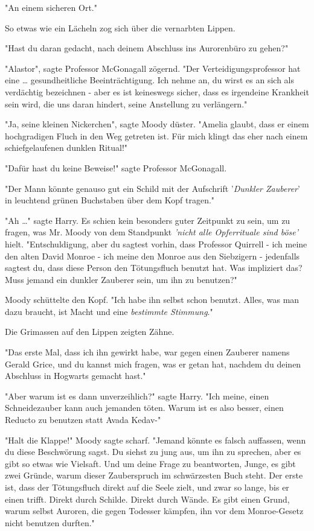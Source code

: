 {"An einem sicheren Ort."

So etwas wie ein Lächeln zog sich über die vernarbten Lippen.

"Hast du daran gedacht, nach deinem Abschluss ins Aurorenbüro zu gehen?"

"Alastor", sagte Professor McGonagall zögernd. "Der Verteidigungsprofessor hat eine … gesundheitliche Beeinträchtigung. Ich nehme an, du wirst es an sich als verdächtig bezeichnen - aber es ist keineswegs sicher, dass es irgendeine Krankheit sein wird, die uns daran hindert, seine Anstellung zu verlängern."

"Ja, seine kleinen Nickerchen", sagte Moody düster. "Amelia glaubt, dass er einem hochgradigen Fluch in den Weg getreten ist. Für mich klingt das eher nach einem schiefgelaufenen dunklen Ritual!"

"Dafür hast du keine Beweise!" sagte Professor McGonagall.

"Der Mann könnte genauso gut ein Schild mit der Aufschrift '\emph{Dunkler Zauberer}' in leuchtend grünen Buchstaben über dem Kopf tragen."

"Ah …" sagte Harry. Es schien kein besonders guter Zeitpunkt zu sein, um zu fragen, was Mr. Moody von dem Standpunkt \emph{'nicht alle Opferrituale sind böse'} hielt. "Entschuldigung, aber du sagtest vorhin, dass Professor Quirrell - ich meine den alten David Monroe - ich meine den Monroe aus den Siebzigern - jedenfalls sagtest du, dass diese Person den Tötungsfluch benutzt hat. Was impliziert das? Muss jemand ein dunkler Zauberer sein, um ihn zu benutzen?"

Moody schüttelte den Kopf. "Ich habe ihn selbst schon benutzt. Alles, was man dazu braucht, ist Macht und eine \emph{bestimmte Stimmung}."

Die Grimassen auf den Lippen zeigten Zähne.

"Das erste Mal, dass ich ihn gewirkt habe, war gegen einen Zauberer namens Gerald Grice, und du kannst mich fragen, was er getan hat, nachdem du deinen Abschluss in Hogwarts gemacht hast."

"Aber warum ist es dann unverzeihlich?" sagte Harry. "Ich meine, einen Schneidezauber kann auch jemanden töten. Warum ist es also besser, einen Reducto zu benutzen statt Avada Kedav-"

"Halt die Klappe!" Moody sagte scharf. "Jemand könnte es falsch auffassen, wenn du diese Beschwörung sagst. Du siehst zu jung aus, um ihn zu sprechen, aber es gibt so etwas wie Vielsaft. Und um deine Frage zu beantworten, Junge, es gibt zwei Gründe, warum dieser Zauberspruch im schwärzesten Buch steht. Der erste ist, dass der Tötungsfluch direkt auf die Seele zielt, und zwar so lange, bis er einen trifft. Direkt durch Schilde. Direkt durch Wände. Es gibt einen Grund, warum selbst Auroren, die gegen Todesser kämpfen, ihn vor dem Monroe-Gesetz nicht benutzen durften."

}
